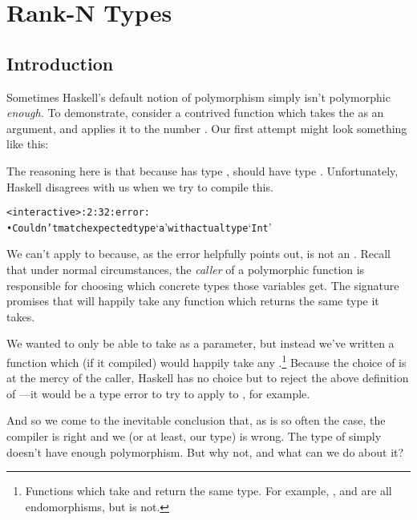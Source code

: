 \documentclass[book.tex]{subfiles}
\begin{document}
\chapter{Rank-N Types}

\section{Introduction}

Sometimes Haskell's default notion of polymorphism simply isn't polymorphic
\emph{enough.} To demonstrate, consider a contrived function which takes the
 as an argument, and applies it to the number .  Our
first attempt might look something like this:


The reasoning here is that because  has type ,\;
 should have type . Unfortunately,
Haskell disagrees with us when we try to compile this.

\begin{alltt}
<interactive>:2:32: error:
    • Couldn't match expected type ‘a’ with actual type ‘Int’
\end{alltt}

We can't apply  to  because, as the error helpfully points out,
 is not an . Recall that under normal circumstances, the
\emph{caller} of a polymorphic function is responsible for choosing which
concrete types those variables get. The signature  promises
that  will happily take any function which returns the same type
it takes.

We wanted  to only be able to take  as a parameter, but
instead we've written a function which (if it compiled) would happily take any
.\footnote{Functions which take and return the same type.
For example, , \; and
 are all endomorphisms, but  is
not.} Because the choice of  is at the mercy of the caller, Haskell has no
choice but to reject the above definition of ---it would be a
type error to try to apply  to , for example.

And so we come to the inevitable conclusion that, as is so often the case, the
compiler is right and we (or at least, our type) is wrong. The type of
 simply doesn't have enough polymorphism. But why not, and what
can we do about it?
\end{document}
